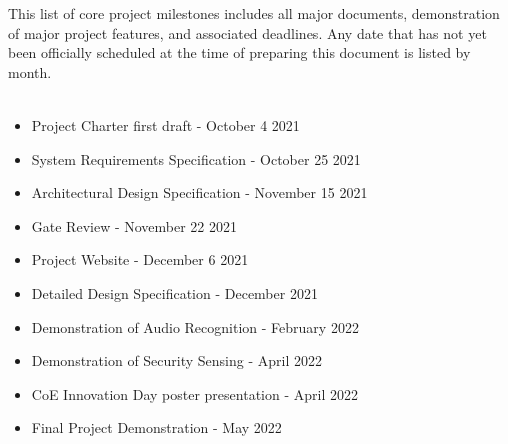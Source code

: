 This list of core project milestones includes all major documents, demonstration of major project features, and associated deadlines. Any date that has not yet been officially scheduled at the time of preparing this document is listed by month.
\\
\\
\begin{itemize}
  \item Project Charter first draft - October 4 2021
  \item System Requirements Specification - October 25 2021
  \item Architectural Design Specification - November 15 2021
  \item Gate Review - November 22 2021
  \item Project Website - December 6 2021
  \item Detailed Design Specification - December 2021
  \item Demonstration of Audio Recognition - February 2022
  \item Demonstration of Security Sensing - April 2022
  \item CoE Innovation Day poster presentation - April 2022
  \item Final Project Demonstration - May 2022
\end{itemize}